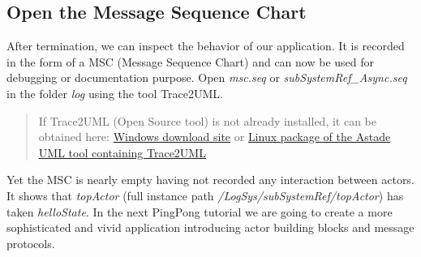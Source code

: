 \subsection{Open the Message Sequence Chart}

After termination, we can inspect the behavior of our application. It is recorded in the form of a MSC (Message Sequence Chart) and can now be used for debugging or documentation purpose. Open \emph{msc.seq} or \emph{subSystemRef\_Async.seq} in the folder \emph{log} using the tool Trace2UML.

\begin{quote}
	If Trace2UML (Open Source tool) is not already installed, it can be obtained here: \href{http://trace2uml.tigris.org/servlets/ProjectDocumentList?folderID=6208}{Windows download site} or \href{http://apt.astade.de/}{Linux package of the Astade UML tool containing Trace2UML}
\end{quote}


Yet the MSC is nearly empty having not recorded any interaction between actors. It shows that  \emph{topActor} (full instance path \emph{/LogSys/subSystemRef/topActor}) has taken \emph{helloState}. In the next PingPong tutorial we are going to create a more sophisticated and vivid \eTrice application introducing actor building blocks and message protocols.

